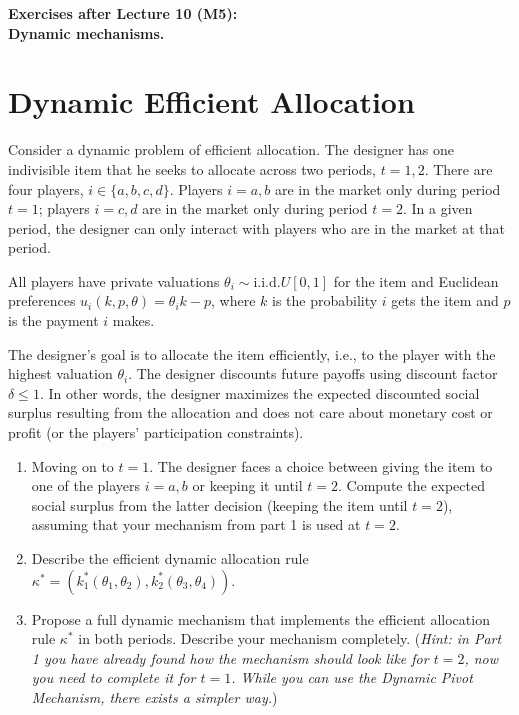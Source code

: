 \documentclass[a4paper]{article}
\begin{document}
\begin{center}
		\LARGE\textbf{Exercises after Lecture 10 (M5):\\ Dynamic mechanisms.}
\end{center}



\section{Dynamic Efficient Allocation}
	Consider a dynamic problem of efficient allocation. The designer has one indivisible item that he seeks to allocate across two periods, $t=1,2$. There are four players, $i\in \{a,b,c,d\}$. Players $i=a,b$ are in the market only during period $t=1$; players $i=c,d$ are in the market only during period $t=2$. In a given period, the designer can only interact with players who are in the market at that period. 
	
	All players have private valuations $\theta_i \sim \text{i.i.d.}U[0,1]$ for the item and Euclidean preferences $u_i(k,p,\theta) = \theta_i k - p$, where $k$ is the probability $i$ gets the item and $p$ is the payment $i$ makes.
	
	The designer's goal is to allocate the item efficiently, i.e., to the player with the highest valuation $\theta_i$. The designer discounts future payoffs using discount factor $\delta \leq 1$. In other words, the designer maximizes the expected discounted social surplus resulting from the allocation and does not care about monetary cost or profit (or the players' participation constraints).
	
	\begin{enumerate}
		Suppose the item was not allocated in period $t=1$, i.e., the designer still has the item in his possession at the beginning of $t=2$. Propose a (static) mechanism that the designer can use to allocate the item efficiently among players $i=c,d$ at $t=2$. Describe your mechanism \emph{completely} and argue that it is incentive compatible (DSIC or BIC).
		\item
		Moving on to $t=1$. The designer faces a choice between giving the item to one of the players $i=a,b$ or keeping it until $t=2$. 
		Compute the expected social surplus from the latter decision (keeping the item until $t=2$), assuming that your mechanism from part 1 is used at $t=2$.
		\item
		Describe the efficient dynamic allocation rule $\kappa^* = (k^*_1(\theta_1,\theta_2), k^*_2(\theta_3,\theta_4))$.
		\item 
		Propose a full dynamic mechanism that implements the efficient allocation rule $\kappa^*$ in both periods. Describe your mechanism completely. (\emph{Hint: in Part 1 you have already found how the mechanism should look like for $t=2$, now you need to complete it for $t=1$. While you can use the Dynamic Pivot Mechanism, there exists a simpler way.})
	\end{enumerate}
	
\end{document}
